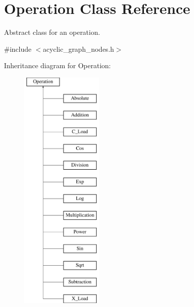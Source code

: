 \hypertarget{classOperation}{}\section{Operation Class Reference}
\label{classOperation}


Abstract class for an operation.  




{\ttfamily \#include $<$acyclic\+\_\+graph\+\_\+nodes.\+h$>$}

Inheritance diagram for Operation\+:\begin{figure}[H]
\begin{center}
\leavevmode
\includegraphics[height=12.000000cm]{classOperation}
\end{center}
\end{figure}
